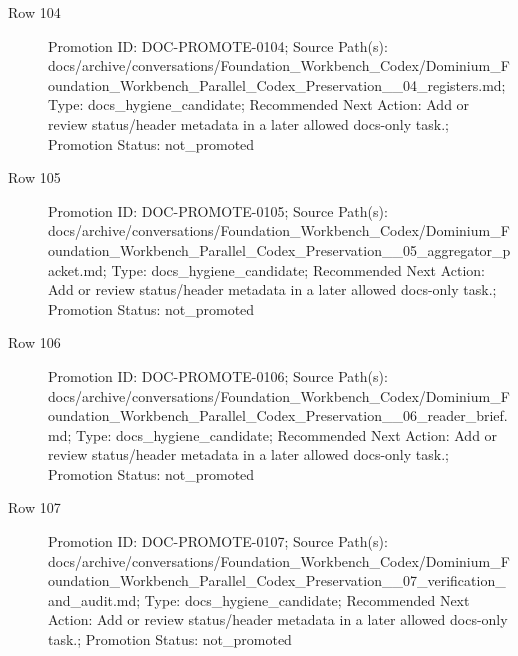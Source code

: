 \documentclass[9pt,a4paper,openany]{book}
\begin{document}
\begin{description}
\item[Row 104] Promotion ID: DOC-\allowbreak{}PROMOTE-\allowbreak{}0104; Source Path(s): docs/\allowbreak{}archive/\allowbreak{}conversations/\allowbreak{}Foundation\_\allowbreak{}Workbench\_\allowbreak{}Codex/\allowbreak{}Dominium\_\allowbreak{}Foundation\_\allowbreak{}Workbench\_\allowbreak{}Parallel\_\allowbreak{}Codex\_\allowbreak{}Preservation\_\allowbreak{}\_\allowbreak{}04\_\allowbreak{}registers.\allowbreak{}md; Type: docs\_\allowbreak{}hygiene\_\allowbreak{}candidate; Recommended Next Action: Add or review status/\allowbreak{}header metadata in a later allowed docs-\allowbreak{}only task.\allowbreak{}; Promotion Status: not\_\allowbreak{}promoted
\item[Row 105] Promotion ID: DOC-\allowbreak{}PROMOTE-\allowbreak{}0105; Source Path(s): docs/\allowbreak{}archive/\allowbreak{}conversations/\allowbreak{}Foundation\_\allowbreak{}Workbench\_\allowbreak{}Codex/\allowbreak{}Dominium\_\allowbreak{}Foundation\_\allowbreak{}Workbench\_\allowbreak{}Parallel\_\allowbreak{}Codex\_\allowbreak{}Preservation\_\allowbreak{}\_\allowbreak{}05\_\allowbreak{}aggregator\_\allowbreak{}packet.\allowbreak{}md; Type: docs\_\allowbreak{}hygiene\_\allowbreak{}candidate; Recommended Next Action: Add or review status/\allowbreak{}header metadata in a later allowed docs-\allowbreak{}only task.\allowbreak{}; Promotion Status: not\_\allowbreak{}promoted
\item[Row 106] Promotion ID: DOC-\allowbreak{}PROMOTE-\allowbreak{}0106; Source Path(s): docs/\allowbreak{}archive/\allowbreak{}conversations/\allowbreak{}Foundation\_\allowbreak{}Workbench\_\allowbreak{}Codex/\allowbreak{}Dominium\_\allowbreak{}Foundation\_\allowbreak{}Workbench\_\allowbreak{}Parallel\_\allowbreak{}Codex\_\allowbreak{}Preservation\_\allowbreak{}\_\allowbreak{}06\_\allowbreak{}reader\_\allowbreak{}brief.\allowbreak{}md; Type: docs\_\allowbreak{}hygiene\_\allowbreak{}candidate; Recommended Next Action: Add or review status/\allowbreak{}header metadata in a later allowed docs-\allowbreak{}only task.\allowbreak{}; Promotion Status: not\_\allowbreak{}promoted
\item[Row 107] Promotion ID: DOC-\allowbreak{}PROMOTE-\allowbreak{}0107; Source Path(s): docs/\allowbreak{}archive/\allowbreak{}conversations/\allowbreak{}Foundation\_\allowbreak{}Workbench\_\allowbreak{}Codex/\allowbreak{}Dominium\_\allowbreak{}Foundation\_\allowbreak{}Workbench\_\allowbreak{}Parallel\_\allowbreak{}Codex\_\allowbreak{}Preservation\_\allowbreak{}\_\allowbreak{}07\_\allowbreak{}verification\_\allowbreak{}and\_\allowbreak{}audit.\allowbreak{}md; Type: docs\_\allowbreak{}hygiene\_\allowbreak{}candidate; Recommended Next Action: Add or review status/\allowbreak{}header metadata in a later allowed docs-\allowbreak{}only task.\allowbreak{}; Promotion Status: not\_\allowbreak{}promoted

\end{description}
\end{document}

